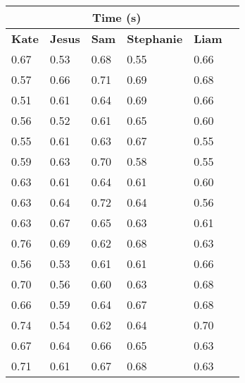 \documentclass[11pt, letterpaper, includehead]{article}
\begin{document}
\begin{center}
  \begin{tabular}{|   m{2cm}  |  m{2cm}  |  m{2cm}  |  m{2cm}  |  m{2cm}  |  m{2cm}  | }
    \hline
    \multicolumn{5}{|c|}{\textbf{Time (s)}}\\
    \hline
    \textbf{Kate} & \textbf{Jesus} & \textbf{Sam} & \textbf{Stephanie} & \textbf{Liam} \\
    \hline
    0.67          & 0.53           & 0.68         & 0.55               & 0.66          \\
    \hline
    0.57          & 0.66           & 0.71         & 0.69               & 0.68          \\
    \hline
    0.51          & 0.61           & 0.64         & 0.69               & 0.66          \\
    \hline
    0.56          & 0.52           & 0.61         & 0.65               & 0.60          \\
    \hline
    0.55          & 0.61           & 0.63         & 0.67               & 0.55          \\
    \hline
    0.59          & 0.63           & 0.70         & 0.58               & 0.55          \\
    \hline
    0.63          & 0.61           & 0.64         & 0.61               & 0.60          \\
    \hline
    0.63          & 0.64           & 0.72         & 0.64               & 0.56          \\
    \hline
    0.63          & 0.67           & 0.65         & 0.63               & 0.61          \\
    \hline
    0.76          & 0.69           & 0.62         & 0.68               & 0.63          \\
    \hline
    0.56          & 0.53           & 0.61         & 0.61               & 0.66          \\
    \hline
    0.70          & 0.56           & 0.60         & 0.63               & 0.68          \\
    \hline
    0.66          & 0.59           & 0.64         & 0.67               & 0.68          \\
    \hline
    0.74          & 0.54           & 0.62         & 0.64               & 0.70          \\
    \hline
    0.67          & 0.64           & 0.66         & 0.65               & 0.63          \\
    \hline
    0.71          & 0.61           & 0.67         & 0.68               & 0.63          \\

\end{tabular}
\end{center}
\end{document}
